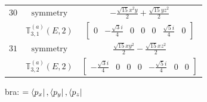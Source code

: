 \documentclass[fleqn,8pt,landscape]{jsarticle}
\begin{document}
\begin{longtable}{ccc}
$ 30 $ & $ \text{symmetry} $ & $ - \frac{\sqrt{15} x^{2} y}{2} + \frac{\sqrt{15} y z^{2}}{2} $ \\
$  $ & $ \mathbb{T}_{3,1}^{(a)}(E,2) $ & $ \begin{bmatrix} 0 & - \frac{\sqrt{3} i}{4} & 0 & 0 & 0 & \frac{\sqrt{5} i}{4} & 0 \end{bmatrix} $ \\ \hline
$ 31 $ & $ \text{symmetry} $ & $ \frac{\sqrt{15} x y^{2}}{2} - \frac{\sqrt{15} x z^{2}}{2} $ \\
$  $ & $ \mathbb{T}_{3,2}^{(a)}(E,2) $ & $ \begin{bmatrix} - \frac{\sqrt{3} i}{4} & 0 & 0 & 0 & - \frac{\sqrt{5} i}{4} & 0 & 0 \end{bmatrix} $ \\ \hline
\end{longtable}
bra: $=\bra{p_{x}}, \bra{p_{y}}, \bra{p_{z}}$
\end{document}
